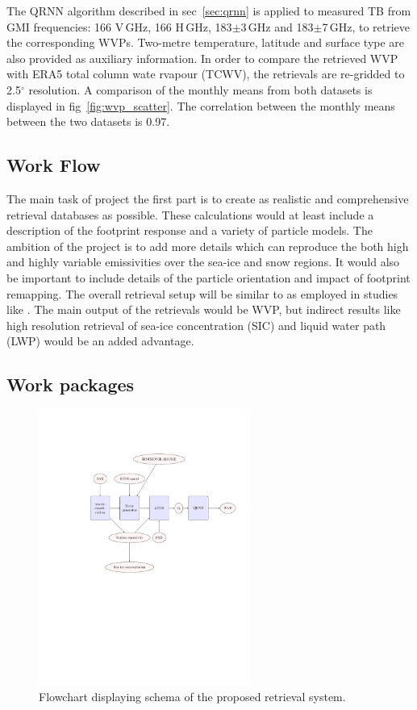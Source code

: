 \documentclass[12pt,oneside,a4paper]{article}
\begin{document}
The QRNN algorithm described in sec~\ref{sec:qrnn} is applied to measured TB from GMI frequencies: 166 V\,GHz, 166 H\,GHz, 183$\pm$3\,GHz and 183$\pm$7\,GHz, to retrieve the corresponding WVPs. Two-metre temperature, latitude and surface type are also provided as auxiliary information. In order to compare the retrieved WVP with ERA5 total column wate rvapour (TCWV), the retrievals are re-gridded to 2.5$^{\circ}$ resolution. A comparison of the monthly means from both datasets is displayed in fig~\ref{fig:wvp_scatter}. The correlation between the monthly means between the two datasets is 0.97. 



\subsection{Work Flow}

The main task of project the first part is to create as realistic and comprehensive retrieval databases as possible. These calculations would at least include a description of the footprint response and a variety of particle models. The ambition of the project is to add more details which can reproduce the both high and highly variable emissivities over the sea-ice and snow regions.  It would also be important to include details of the particle orientation
and impact of footprint remapping. The overall retrieval setup will be similar to as employed in studies like \citep{eriksson:towar:20, ekelund:using:20}. The main output of the retrievals would be WVP, but indirect results like high resolution retrieval of sea-ice concentration (SIC) and liquid water path (LWP) would be an added advantage.


\subsection{Work packages}

\begin{figure}[t]
	\centering
	\includegraphics[trim=140 290 20 100,clip,height = 90mm]{flowchart.pdf} 
	\caption{Flowchart displaying schema of the proposed retrieval system.}
	\label{fig:flowchart}
\end{figure}
\end{document}
